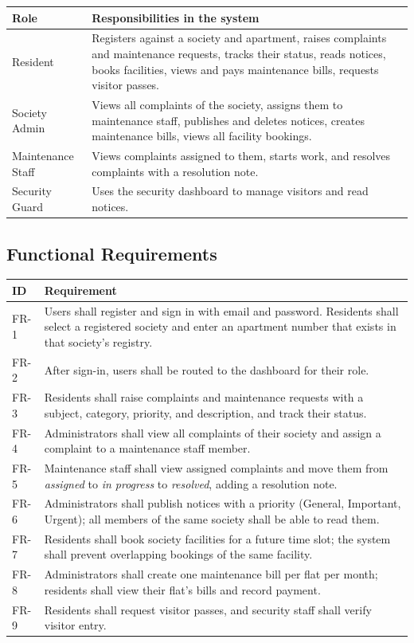 \documentclass{tietreport}
\renewcommand{\_}{\textunderscore\allowbreak}
\begin{document}
\begin{longtable}{L{3.2cm} L{10.6cm}}
\toprule
\textbf{Role} & \textbf{Responsibilities in the system} \\
\midrule
\endhead
Resident & Registers against a society and apartment, raises complaints and
maintenance requests, tracks their status, reads notices, books facilities,
views and pays maintenance bills, requests visitor passes. \\
Society Admin & Views all complaints of the society, assigns them to
maintenance staff, publishes and deletes notices, creates maintenance bills,
views all facility bookings. \\
Maintenance Staff & Views complaints assigned to them, starts work, and
resolves complaints with a resolution note. \\
Security Guard & Uses the security dashboard to manage visitors and read
notices. \\
\bottomrule
\end{longtable}

\subsection{Functional Requirements}

\begin{longtable}{L{1.4cm} L{12.4cm}}
\toprule
\textbf{ID} & \textbf{Requirement} \\
\midrule
\endhead
FR-1 & Users shall register and sign in with email and password. Residents
shall select a registered society and enter an apartment number that exists
in that society's registry. \\
FR-2 & After sign-in, users shall be routed to the dashboard for their role. \\
FR-3 & Residents shall raise complaints and maintenance requests with a
subject, category, priority, and description, and track their status. \\
FR-4 & Administrators shall view all complaints of their society and assign
a complaint to a maintenance staff member. \\
FR-5 & Maintenance staff shall view assigned complaints and move them from
\textit{assigned} to \textit{in progress} to \textit{resolved}, adding a
resolution note. \\
FR-6 & Administrators shall publish notices with a priority (General,
Important, Urgent); all members of the same society shall be able to read
them. \\
FR-7 & Residents shall book society facilities for a future time slot; the
system shall prevent overlapping bookings of the same facility. \\
FR-8 & Administrators shall create one maintenance bill per flat per month;
residents shall view their flat's bills and record payment. \\
FR-9 & Residents shall request visitor passes, and security staff shall
verify visitor entry. \\
\bottomrule
\end{longtable}
\end{document}
